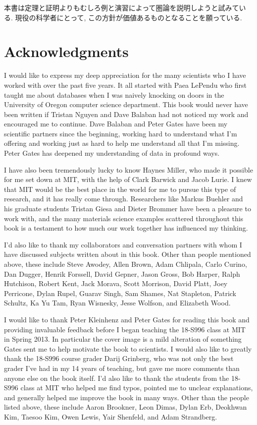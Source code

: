 本書は定理と証明よりもむしろ例と演習によって圏論を説明しようと試みている. 現役の科学者にとって, この方針が価値あるものとなることを願っている.

\section{Acknowledgments}

I would like to express my deep appreciation for the many scientists who I have worked with over the past five years. It all started with Paea LePendu who first taught me about databases when I was naively knocking on doors in the University of Oregon computer science department. This book would never have been written if Tristan Nguyen and Dave Balaban had not noticed my work and encouraged me to continue. Dave Balaban and Peter Gates have been my scientific partners since the beginning, working hard to understand what I'm offering and working just as hard to help me understand all that I'm missing. Peter Gates has deepened my understanding of data in profound ways. 

I have also been tremendously lucky to know Haynes Miller, who made it possible for me set down at MIT, with the help of Clark Barwick and Jacob Lurie. I knew that MIT would be the best place in the world for me to pursue this type of research, and it has really come through. Researchers like Markus Buehler and his graduate students Tristan Giesa and Dieter Brommer have been a pleasure to work with, and the many materials science examples scattered throughout this book is a testament to how much our work together has influenced my thinking. 

I'd also like to thank my collaborators and conversation partners with whom I have discussed subjects written about in this book. Other than people mentioned above, these include Steve Awodey, Allen Brown, Adam Chlipala, Carlo Curino, Dan Dugger, Henrik Forssell, David Gepner, Jason Gross, Bob Harper, Ralph Hutchison, Robert Kent, Jack Morava, Scott Morrison, David Platt, Joey Perricone, Dylan Rupel, Guarav Singh, Sam Shames, Nat Stapleton, Patrick Schultz, Ka Yu Tam, Ryan Wisnesky, Jesse Wolfson, and Elizabeth Wood.

I would like to thank Peter Kleinhenz and Peter Gates for reading this book and providing invaluable feedback before I began teaching the 18-S996 class at MIT in Spring 2013. In particular the cover image is a mild alteration of something Gates sent me to help motivate the book to scientists. I would also like to greatly thank the 18-S996 course grader Darij Grinberg, who was not only the best grader I've had in my 14 years of teaching, but gave me more comments than anyone else on the book itself. I'd also like to thank the students from the 18-S996 class at MIT who helped me find typos, pointed me to unclear explanations, and generally helped me improve the book in many ways. Other than the people listed above, these include Aaron Brookner, Leon Dimas, Dylan Erb, Deokhwan Kim, Taesoo Kim, Owen Lewis, Yair Shenfeld, and Adam Strandberg.

